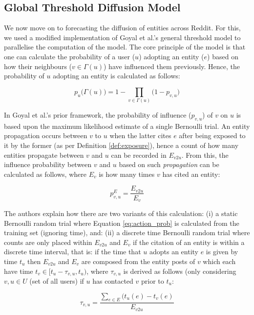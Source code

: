 \documentclass[10pt,journal,compsoc]{IEEEtran}
\begin{document}
\subsection{Global Threshold Diffusion Model}
We now move on to forecasting the diffusion of entities across Reddit.
For this, we used a modified implementation of Goyal et al.'s general threshold model \cite{goyal2010learning} to parallelise the computation of the model.
The core principle of the model is that one can calculate the probability of a user ($u$) adopting an entity ($e$) based on how their neighbours ($v \in \Gamma(u)$) have influenced them previously.
Hence, the probability of $u$ adopting an entity is calculated as follows:

\begin{equation}
\label{eq:joint_prob}
p_u\big(\Gamma(u)\big) = 1 - \displaystyle\prod_{v \in \Gamma(u)}\big(1 - p_{v,u}\big)
\end{equation}

In Goyal et al.'s prior framework, the probability of influence ($p_{v,u}$) of $v$ on $u$ is based upon the maximum likelihood estimate of a single Bernoulli trial.
An entity propagation occurs between $v$ to $u$ when the latter cites $e$ after being exposed to it by the former (as per Definition \ref{def:exposure}), hence a count of how many entities propagate between $v$ and $u$ can be recorded in $E_{v2u}$.
From this, the influence probability between $v$ and $u$ based on such \emph{propagation} can be calculated as follows, where $E_v$ is how many times $v$ has cited an entity:

\begin{equation}
\label{eq:action_prob}
p^{E}_{v,u} = \frac{E_{v2u}}{E_v}
\end{equation}

The authors explain how there are two variants of this calculation: (i) a static Bernoulli random trial where Equation \ref{eq:action_prob} is calculated from the training set (ignoring time), and: (ii) a discrete time Bernoulli random trial where counts are only placed within $E_{v2u}$ and $E_v$ if the citation of an entity is within a discrete time interval, that is: if the time that $u$ adopts an entity $e$ is given by time $t_u$ then $E_{v2u}$ and $E_v$ are composed from the entity posts of $v$ which each have time $t_v \in [t_u - \tau_{v,u}, t_u)$, where $\tau_{v,u}$ is derived as follows (only considering $v, u \in U$ (set of all users) if $u$ has contacted $v$ prior to $t_u$:

\begin{equation}
\tau_{v,u} = \frac{\displaystyle\sum_{e \in E} (t_u(e) - t_v(e)}{E_{v2u}}
\end{equation}
\end{document}
